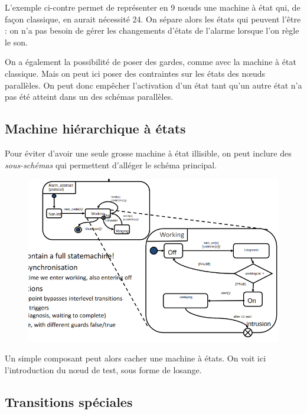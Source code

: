 \documentclass[../Syllabus.tex]{subfiles}
\begin{document}
L'exemple ci-contre permet de représenter en 9 nœuds une machine à état qui, de façon classique, en aurait nécessité 24. On sépare alors les états qui peuvent l'être : on n'a pas besoin de gérer les changements d'états de l'alarme lorsque l'on règle le son.

On a également la possibilité de poser des gardes, comme avec la machine à état classique. Mais on peut ici poser des contraintes sur les états des nœuds parallèles. On peut donc empêcher l'activation d'un état tant qu'un autre état n'a pas été atteint dans un des schémas parallèles.

\vspace{0.7cm}

\subsection{Machine hiérarchique à états}

Pour éviter d'avoir une seule grosse machine à état illisible, on peut inclure des \textit{sous-schémas} qui permettent d'alléger le schéma principal.

\begin{figure}
    \includegraphics[scale=0.35]{img/exempleHierarchicalMachine.png}
\end{figure}

Un simple composant peut alors cacher une machine à états. On voit ici l'introduction du nœud de test, sous forme de losange.

\vspace{6cm}

\subsection{Transitions spéciales}
\end{document}
